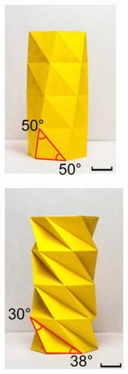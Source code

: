 \begin{figure}
\centering
\begin{minipage}{.5\textwidth}
  \centering
  \includegraphics[width=.4\linewidth]{introduction/fig/HardDeploy.png}
  \label{fig:EDEC}
\end{minipage}%
\begin{minipage}{.5\textwidth}
  \centering
  \includegraphics[width=.4\linewidth]{introduction/fig/EasyDeploy.png}
  \label{fig:HDHC}
\end{minipage}
\end{figure}


